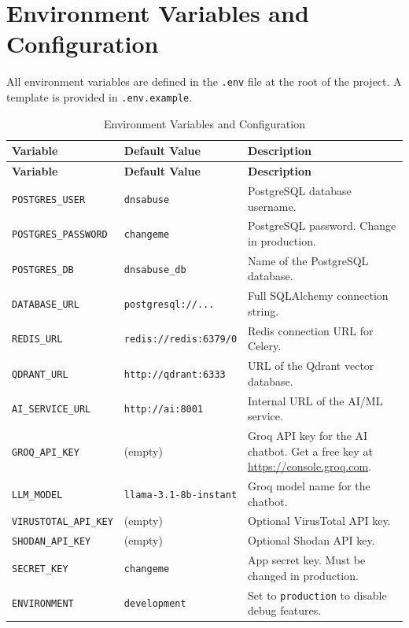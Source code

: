 \documentclass[12pt, a4paper, oneside]{report}
\begin{document}
\chapter{Environment Variables and Configuration}
\label{app:env}

All environment variables are defined in the \texttt{.env} file at the root of the project. A template is provided in \texttt{.env.example}.

\begin{longtable}{|p{4.5cm}|p{4.5cm}|p{5cm}|}
\caption{Environment Variables and Configuration}\\
\hline
\rowcolor{nfsuBlue!15}
\textbf{Variable} & \textbf{Default Value} & \textbf{Description} \\
\hline
\endfirsthead
\hline
\rowcolor{nfsuBlue!15}
\textbf{Variable} & \textbf{Default Value} & \textbf{Description} \\
\hline
\endhead
\hline
\endfoot
\texttt{POSTGRES\_USER} & \texttt{dnsabuse} & PostgreSQL database username. \\
\hline
\texttt{POSTGRES\_PASSWORD} & \texttt{changeme} & PostgreSQL password. Change in production. \\
\hline
\texttt{POSTGRES\_DB} & \texttt{dnsabuse\_db} & Name of the PostgreSQL database. \\
\hline
\texttt{DATABASE\_URL} & \texttt{postgresql://...} & Full SQLAlchemy connection string. \\
\hline
\texttt{REDIS\_URL} & \texttt{redis://redis:6379/0} & Redis connection URL for Celery. \\
\hline
\texttt{QDRANT\_URL} & \texttt{http://qdrant:6333} & URL of the Qdrant vector database. \\
\hline
\texttt{AI\_SERVICE\_URL} & \texttt{http://ai:8001} & Internal URL of the AI/ML service. \\
\hline
\texttt{GROQ\_API\_KEY} & (empty) & Groq API key for the AI chatbot. Get a free key at \url{https://console.groq.com}. \\
\hline
\texttt{LLM\_MODEL} & \texttt{llama-3.1-8b-instant} & Groq model name for the chatbot. \\
\hline
\texttt{VIRUSTOTAL\_API\_KEY} & (empty) & Optional VirusTotal API key. \\
\hline
\texttt{SHODAN\_API\_KEY} & (empty) & Optional Shodan API key. \\
\hline
\texttt{SECRET\_KEY} & \texttt{changeme} & App secret key. Must be changed in production. \\
\hline
\texttt{ENVIRONMENT} & \texttt{development} & Set to \texttt{production} to disable debug features. \\
\hline
\end{longtable}
\end{document}
